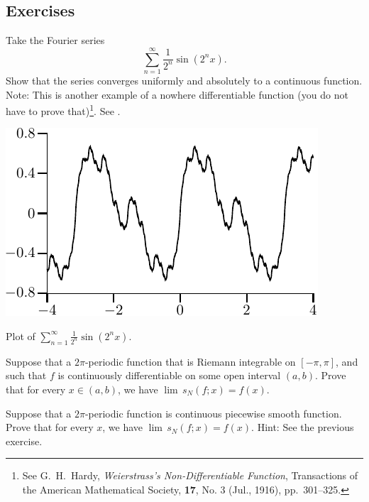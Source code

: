 \subsection{Exercises}

\begin{exercise}
Take the Fourier series
\begin{equation*}
\sum_{n=1}^\infty \frac{1}{2^n} \sin(2^n x) .
\end{equation*}
Show that the series converges uniformly and absolutely to a continuous
function.  Note: This is another example of a nowhere differentiable
function (you do not have to prove that)\footnote{%
See
G.\ H.\ Hardy, \emph{Weierstrass's Non-Differentiable Function},
Transactions of the American Mathematical Society,
\textbf{17}, No. 3 (Jul., 1916), pp.\ 301--325.}.
See .
\end{exercise}

\begin{myfigureht}
\includegraphics{figures/fourierserweier}
\caption{Plot of 
$\sum_{n=1}^\infty \frac{1}{2^n} \sin(2^n x)$.\label{fig:fourierserweier}}
\end{myfigureht}

\begin{exercise}
Suppose that a $2\pi$-periodic function that is Riemann integrable
on $[-\pi,\pi]$, and such that $f$ is continuously differentiable
on some open interval $(a,b)$.  Prove that
for every $x \in (a,b)$, we have $\lim\, s_N(f;x) = f(x)$.
\end{exercise}

\begin{exercise}
Suppose that a $2\pi$-periodic function is continuous piecewise
smooth function.  Prove that
for every $x$, we have $\lim\, s_N(f;x) = f(x)$.  Hint: See the previous
exercise.
\end{exercise}

